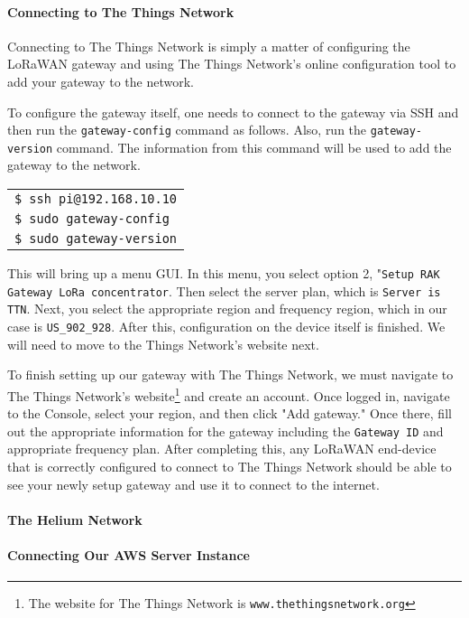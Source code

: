 \paragraph{Connecting to The Things Network}
Connecting to The Things Network is simply a matter of configuring the LoRaWAN gateway and using The Things Network's online configuration tool to add your gateway to the network.

To configure the gateway itself, one needs to connect to the gateway via SSH and then run the \texttt{gateway-config} command as follows. Also, run the \texttt{gateway-version} command. The information from this command will be used to add the gateway to the network.

\begin{tabular}{l}
     \texttt{\$ ssh pi@192.168.10.10} \\
     \texttt{\$ sudo gateway-config} \\
     \texttt{\$ sudo gateway-version} \\ 
\end{tabular}

This will bring up a menu GUI. In this menu, you select option 2, "\texttt{Setup RAK Gateway LoRa concentrator}. Then select the server plan, which is \texttt{Server is TTN}. Next, you select the appropriate region and frequency region, which in our case is \texttt{US\_902\_928}. After this, configuration on the device itself is finished. We will need to move to the Things Network's website next.

To finish setting up our gateway with The Things Network, we must navigate to The Things Network's website\footnote{The website for The Things Network is \texttt{www.thethingsnetwork.org}} and create an account. Once logged in, navigate to the Console, select your region, and then click "Add gateway." Once there, fill out the appropriate information for the gateway including the \texttt{Gateway ID} and appropriate frequency plan. After completing this, any LoRaWAN end-device that is correctly configured to connect to The Things Network should be able to see your newly setup gateway and use it to connect to the internet.

\paragraph{The Helium Network}

\paragraph{Connecting Our AWS Server Instance}


